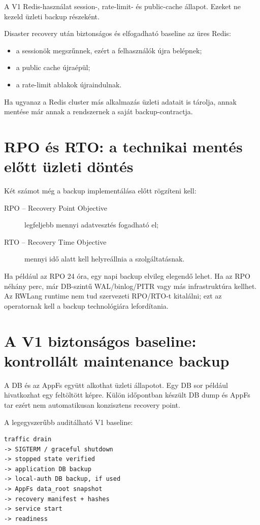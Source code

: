 A V1 Redis-használat session-, rate-limit- és public-cache állapot. Ezeket ne kezeld üzleti backup részeként.

Disaster recovery után biztonságos és elfogadható baseline az üres Redis:

\begin{itemize}
  \item a sessionök megszűnnek, ezért a felhasználók újra belépnek;
  \item a public cache újraépül;
  \item a rate-limit ablakok újraindulnak.
\end{itemize}

Ha ugyanaz a Redis cluster más alkalmazás üzleti adatait is tárolja, annak mentése már annak a rendszernek a saját backup-contractja.

\section{RPO és RTO: a technikai mentés előtt üzleti döntés}

Két számot még a backup implementálása előtt rögzíteni kell:

\begin{description}
  \item[RPO -- Recovery Point Objective] legfeljebb mennyi adatvesztés fogadható el;
  \item[RTO -- Recovery Time Objective] mennyi idő alatt kell helyreállnia a szolgáltatásnak.
\end{description}

Ha például az RPO 24 óra, egy napi backup elvileg elegendő lehet. Ha az RPO néhány perc, már DB-szintű WAL/binlog/PITR vagy más infrastruktúra kellhet. Az RWLang runtime nem tud szervezeti RPO/RTO-t kitalálni; ezt az operatornak kell a backup technológiára lefordítania.

\section{A V1 biztonságos baseline: kontrollált maintenance backup}

A DB és az AppFs együtt alkothat üzleti állapotot. Egy DB sor például hivatkozhat egy feltöltött képre. Külön időpontban készült DB dump és AppFs tar ezért nem automatikusan konzisztens recovery point.

A legegyszerűbb auditálható V1 baseline:

\begin{lstlisting}
traffic drain
-> SIGTERM / graceful shutdown
-> stopped state verified
-> application DB backup
-> local-auth DB backup, if used
-> AppFs data_root snapshot
-> recovery manifest + hashes
-> service start
-> readiness
\end{lstlisting}

